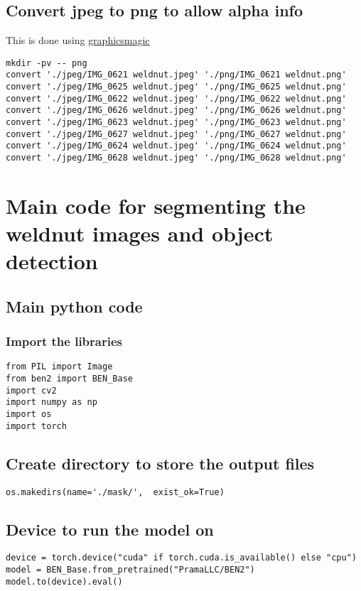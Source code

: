 \documentclass[11pt]{article}
\begin{document}
\subsection{Convert jpeg to png to allow alpha info}
\label{sec:org3bfa1f9}
This is done using \href{http://www.graphicsmagick.org/}{graphicsmagic}
\begin{verbatim}
mkdir -pv -- png
convert './jpeg/IMG_0621 weldnut.jpeg' './png/IMG_0621 weldnut.png'
convert './jpeg/IMG_0625 weldnut.jpeg' './png/IMG_0625 weldnut.png'
convert './jpeg/IMG_0622 weldnut.jpeg' './png/IMG_0622 weldnut.png'
convert './jpeg/IMG_0626 weldnut.jpeg' './png/IMG_0626 weldnut.png'
convert './jpeg/IMG_0623 weldnut.jpeg' './png/IMG_0623 weldnut.png'
convert './jpeg/IMG_0627 weldnut.jpeg' './png/IMG_0627 weldnut.png'
convert './jpeg/IMG_0624 weldnut.jpeg' './png/IMG_0624 weldnut.png'
convert './jpeg/IMG_0628 weldnut.jpeg' './png/IMG_0628 weldnut.png'
\end{verbatim}
\section{Main code for segmenting the weldnut images and object detection}
\label{sec:org7da1484}

\subsection{Main python code}
\label{sec:orgb62e9d4}

\subsubsection{Import the libraries}
\label{sec:orgc67b5db}
\begin{verbatim}
from PIL import Image
from ben2 import BEN_Base
import cv2
import numpy as np
import os
import torch
\end{verbatim}
\subsection{Create directory to store the output files}
\label{sec:orgfb33079}
\begin{verbatim}
os.makedirs(name='./mask/',  exist_ok=True)
\end{verbatim}
\subsection{Device to run the model on}
\label{sec:orgcbbc7ef}
\begin{verbatim}
device = torch.device("cuda" if torch.cuda.is_available() else "cpu")
model = BEN_Base.from_pretrained("PramaLLC/BEN2")
model.to(device).eval()
\end{verbatim}
\end{document}
